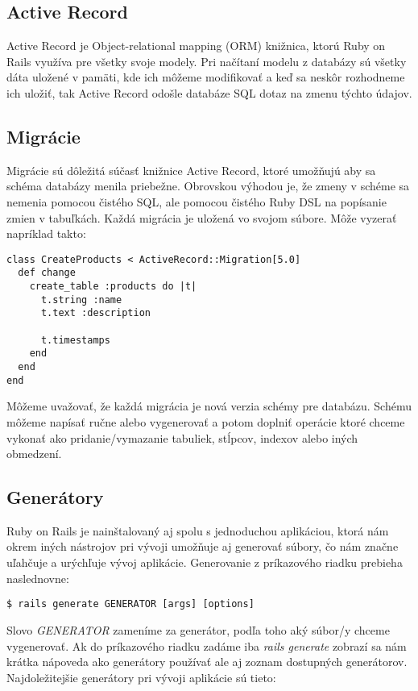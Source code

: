 \subsection{Active Record}

Active Record je Object-relational mapping (ORM) knižnica, ktorú Ruby on Rails využíva pre všetky svoje modely. Pri načítaní modelu z databázy sú všetky dáta uložené v pamäti, kde ich môžeme modifikovať a keď sa neskôr rozhodneme ich uložiť, tak Active Record odošle databáze SQL dotaz na zmenu týchto údajov.

\subsection{Migrácie}

Migrácie sú dôležitá súčasť knižnice Active Record, ktoré umožňujú aby sa schéma databázy menila priebežne. Obrovskou výhodou je, že zmeny v schéme sa nemenia pomocou čistého SQL, ale pomocou čistého Ruby DSL na popísanie zmien v tabuľkách.
Každá migrácia je uložená vo svojom súbore. Môže vyzerať napríklad takto:

\begin{verbatim}
class CreateProducts < ActiveRecord::Migration[5.0]
  def change
    create_table :products do |t|
      t.string :name
      t.text :description
 
      t.timestamps
    end
  end
end
\end{verbatim}

Môžeme uvažovať, že každá migrácia je nová verzia schémy pre databázu. Schému môžeme napísať ručne alebo vygenerovať a potom doplniť operácie ktoré chceme vykonať ako pridanie/vymazanie tabuliek, stĺpcov, indexov alebo iných obmedzení.

\subsection{Generátory}

Ruby on Rails je nainštalovaný aj spolu s jednoduchou aplikáciou, ktorá nám okrem iných nástrojov pri vývoji umožňuje aj generovať súbory, čo nám značne uľahčuje a urýchľuje vývoj aplikácie. Generovanie z príkazového riadku prebieha naslednovne:

\begin{verbatim}
$ rails generate GENERATOR [args] [options]
\end{verbatim}

Slovo \emph{GENERATOR} zameníme za generátor, podľa toho aký súbor/y chceme vygenerovať. Ak do príkazového riadku zadáme iba \emph{rails generate} zobrazí sa nám krátka nápoveda ako generátory používať ale aj zoznam dostupných generátorov. Najdoležitejšie generátory pri vývoji aplikácie sú tieto:

